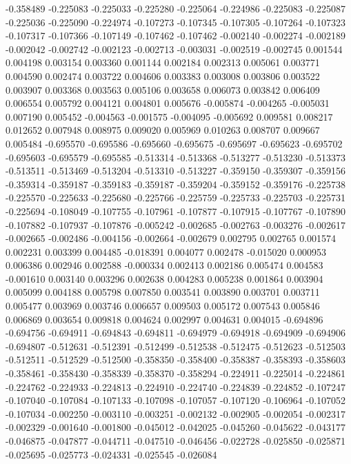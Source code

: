 -0.358489
-0.225083
-0.225033
-0.225280
-0.225064
-0.224986
-0.225083
-0.225087
-0.225036
-0.225090
-0.224974
-0.107273
-0.107345
-0.107305
-0.107264
-0.107323
-0.107317
-0.107366
-0.107149
-0.107462
-0.107462
-0.002140
-0.002274
-0.002189
-0.002042
-0.002742
-0.002123
-0.002713
-0.003031
-0.002519
-0.002745
0.001544
0.004198
0.003154
0.003360
0.001144
0.002184
0.002313
0.005061
0.003771
0.004590
0.002474
0.003722
0.004606
0.003383
0.003008
0.003806
0.003522
0.003907
0.003368
0.003563
0.005106
0.003658
0.006073
0.003842
0.006409
0.006554
0.005792
0.004121
0.004801
0.005676
-0.005874
-0.004265
-0.005031
0.007190
0.005452
-0.004563
-0.001575
-0.004095
-0.005692
0.009581
0.008217
0.012652
0.007948
0.008975
0.009020
0.005969
0.010263
0.008707
0.009667
0.005484
-0.695570
-0.695586
-0.695660
-0.695675
-0.695697
-0.695623
-0.695702
-0.695603
-0.695579
-0.695585
-0.513314
-0.513368
-0.513277
-0.513230
-0.513373
-0.513511
-0.513469
-0.513204
-0.513310
-0.513227
-0.359150
-0.359307
-0.359156
-0.359314
-0.359187
-0.359183
-0.359187
-0.359204
-0.359152
-0.359176
-0.225738
-0.225570
-0.225633
-0.225680
-0.225766
-0.225759
-0.225733
-0.225703
-0.225731
-0.225694
-0.108049
-0.107755
-0.107961
-0.107877
-0.107915
-0.107767
-0.107890
-0.107882
-0.107937
-0.107876
-0.005242
-0.002685
-0.002763
-0.003276
-0.002617
-0.002665
-0.002486
-0.004156
-0.002664
-0.002679
0.002795
0.002765
0.001574
0.002231
0.003399
0.004485
-0.018391
0.004077
0.002478
-0.015020
0.000953
0.006386
0.002946
0.002588
-0.000334
0.002413
0.002186
0.005474
0.004583
-0.001610
0.003140
0.003296
0.002638
0.004283
0.005238
0.001864
0.003904
0.005099
0.004188
0.005798
0.007850
0.003541
0.003890
0.003701
0.003711
0.005477
0.003969
0.003746
0.006657
0.009503
0.005172
0.007543
0.005846
0.006869
0.003654
0.009818
0.004624
0.002997
0.004631
0.004015
-0.694896
-0.694756
-0.694911
-0.694843
-0.694811
-0.694979
-0.694918
-0.694909
-0.694906
-0.694807
-0.512631
-0.512391
-0.512499
-0.512538
-0.512475
-0.512623
-0.512503
-0.512511
-0.512529
-0.512500
-0.358350
-0.358400
-0.358387
-0.358393
-0.358603
-0.358461
-0.358430
-0.358339
-0.358370
-0.358294
-0.224911
-0.225014
-0.224861
-0.224762
-0.224933
-0.224813
-0.224910
-0.224740
-0.224839
-0.224852
-0.107247
-0.107040
-0.107084
-0.107133
-0.107098
-0.107057
-0.107120
-0.106964
-0.107052
-0.107034
-0.002250
-0.003110
-0.003251
-0.002132
-0.002905
-0.002054
-0.002317
-0.002329
-0.001640
-0.001800
-0.045012
-0.042025
-0.045260
-0.045622
-0.043177
-0.046875
-0.047877
-0.044711
-0.047510
-0.046456
-0.022728
-0.025850
-0.025871
-0.025695
-0.025773
-0.024331
-0.025545
-0.026084
